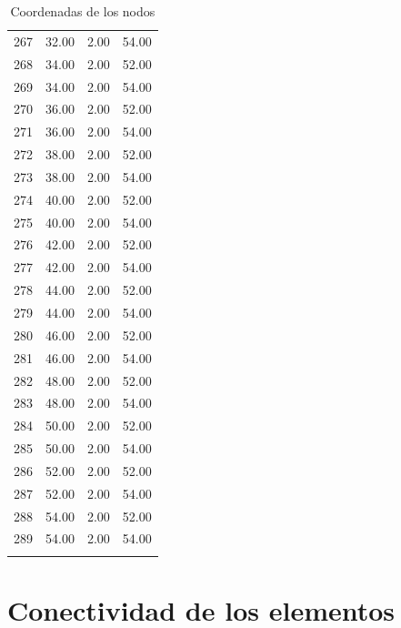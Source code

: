 \documentclass[a4paper,11pt]{article}
\begin{document}
\begin{center}
\begin{longtable}{|R{1.5cm}|R{2.4cm}|R{2.4cm}|R{2.4cm}|}
  267 &  32.00  &   2.00  &  54.00 \\ 
  268 &  34.00  &   2.00  &  52.00 \\ 
  269 &  34.00  &   2.00  &  54.00 \\ 
  270 &  36.00  &   2.00  &  52.00 \\ 
  271 &  36.00  &   2.00  &  54.00 \\ 
  272 &  38.00  &   2.00  &  52.00 \\ 
  273 &  38.00  &   2.00  &  54.00 \\ 
  274 &  40.00  &   2.00  &  52.00 \\ 
  275 &  40.00  &   2.00  &  54.00 \\ 
  276 &  42.00  &   2.00  &  52.00 \\ 
  277 &  42.00  &   2.00  &  54.00 \\ 
  278 &  44.00  &   2.00  &  52.00 \\ 
  279 &  44.00  &   2.00  &  54.00 \\ 
  280 &  46.00  &   2.00  &  52.00 \\ 
  281 &  46.00  &   2.00  &  54.00 \\ 
  282 &  48.00  &   2.00  &  52.00 \\ 
  283 &  48.00  &   2.00  &  54.00 \\ 
  284 &  50.00  &   2.00  &  52.00 \\ 
  285 &  50.00  &   2.00  &  54.00 \\ 
  286 &  52.00  &   2.00  &  52.00 \\ 
  287 &  52.00  &   2.00  &  54.00 \\ 
  288 &  54.00  &   2.00  &  52.00 \\ 
  289 &  54.00  &   2.00  &  54.00 \\ 
\bottomrule[0.8mm]                               
\caption{Coordenadas de los nodos}             
\end{longtable}                                  
\end{center}                                     

\newpage       

\section{Conectividad de los elementos} 
\end{document}
